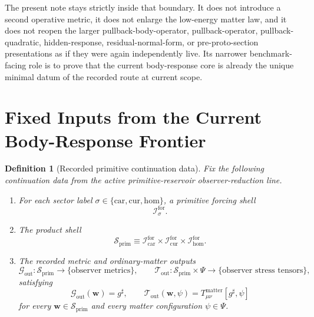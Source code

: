 \documentclass[11pt]{article}
\newcommand{\CompletedMetric}{g^{\sharp}}
\newcommand{\MatterSpace}{\Psi}
\newcommand{\Car}{\mathrm{car}}
\newcommand{\Cur}{\mathrm{cur}}
\newcommand{\Hom}{\mathrm{hom}}
\newcommand{\ForSpace}[1]{\mathcal I_{#1}^{\mathrm{for}}}
\newcommand{\PrimShell}{\mathcal S_{\mathrm{prim}}}
\newcommand{\MetricOut}{\mathscr G_{\mathrm{out}}}
\newcommand{\MatterOut}{\mathscr T_{\mathrm{out}}}
\newtheorem{definition}{Definition}
\begin{document}
The present note stays strictly inside that boundary. It does not introduce a second operative metric, it does not enlarge the low-energy matter law, and it does not reopen the larger pullback-body-operator, pullback-operator, pullback-quadratic, hidden-response, residual-normal-form, or pre-proto-section presentations as if they were again independently live. Its narrower benchmark-facing role is to prove that the current body-response core is already the unique minimal datum of the recorded route at current scope.

\section{Fixed Inputs from the Current Body-Response Frontier}

\begin{definition}[Recorded primitive continuation data]
\label{def:fixed}
Fix the following continuation data from the active primitive-reservoir observer-reduction line.
\begin{enumerate}
    \item For each sector label \(\sigma\in\{\Car,\Cur,\Hom\}\), a primitive forcing shell
    \[
    \ForSpace{\sigma}.
    \]
    \item The product shell
    \[
    \PrimShell
    \equiv
    \ForSpace{\Car}\times \ForSpace{\Cur}\times \ForSpace{\Hom}.
    \]
    \item The recorded metric and ordinary-matter outputs
    \[
    \MetricOut:\PrimShell\to\{\text{observer metrics}\},
    \qquad
    \MatterOut:\PrimShell\times\MatterSpace\to\{\text{observer stress tensors}\},
    \]
    satisfying
    \begin{equation}
    \MetricOut(\mathbf w)=\CompletedMetric,
    \qquad
    \MatterOut(\mathbf w,\psi)
    =
    T_{\mu\nu}^{\mathrm{matter}}[\CompletedMetric,\psi]
    \label{eq:fixedoutputs}
    \end{equation}
    for every \(\mathbf w\in\PrimShell\) and every matter configuration \(\psi\in\MatterSpace\).
\end{enumerate}
\end{definition}
\end{document}
